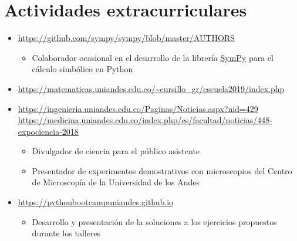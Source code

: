 \documentclass[11pt, letterpaper, sans]{moderncv}        %
\begin{document}
\section{Actividades extracurriculares}

	\begin{itemize}
		\item{
			{
				\url{https://github.com/sympy/sympy/blob/master/AUTHORS}
				\vspace{3pt}
				\begin{itemize}
					\item Colaborador ocasional en el desarrollo de la librería \href{https://www.sympy.org/en/index.html}{\color{blue}SymPy} para el cálculo simbólico en {\color{blue}Python}
				\end{itemize}
			}
		}
		\item{
			{
				\url{https://matematicas.uniandes.edu.co/~cursillo_gr/escuela2019/index.php}
			}
		}
	
		\item{
			{
				\url{https://ingenieria.uniandes.edu.co/Paginas/Noticias.aspx?nid=429}\\
				\url{https://medicina.uniandes.edu.co/index.php/es/facultad/noticias/448-expociencia-2018}
				\vspace{3pt}
				\begin{itemize}
					\item Divulgador de ciencia para el p\'ublico asistente
					\item Presentador de experimentos demostrativos con microscopios del Centro de Microscop\'ia de la Universidad de los Andes
				\end{itemize}
			}
		}
	
		\item{
			{
				\url{https://pythonbootcampuniandes.github.io}
				\vspace{3pt}
				\begin{itemize}
					\item Desarrollo y presentación de la soluciones a los ejercicios propuestos durante los talleres
				\end{itemize}
			}
		}
	

\end{itemize}
\end{document}
